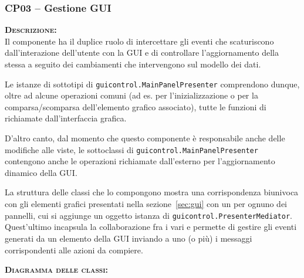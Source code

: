 \subsubsection{CP03 -- Gestione GUI}
\begin{description}
	\item{\scshape\bfseries Descrizione:}\\
Il componente ha il duplice ruolo di intercettare gli eventi che scaturiscono dall'interazione dell'utente con la GUI e di controllare l'aggiornamento della stessa a seguito dei cambiamenti che intervengono sul modello dei dati.

Le istanze di sottotipi di \texttt{guicontrol.MainPanelPresenter} comprendono dunque, oltre ad alcune operazioni comuni (ad es. per l'inizializzazione o per la comparsa/scomparsa dell'elemento grafico associato), tutte le funzioni di  richiamate dall'interfaccia grafica.

D'altro canto, dal momento che questo componente è responsabile anche delle modifiche alle viste, le sottoclassi di \texttt{guicontrol.MainPanelPresenter} contengono anche le operazioni richiamate dall'esterno per l'aggiornamento dinamico della GUI\@.

La struttura delle classi che lo compongono mostra una corrispondenza biunivoca con gli elementi grafici presentati nella sezione~\ref{sec:gui} con un  per ognuno dei pannelli, cui si aggiunge un oggetto istanza di \texttt{guicontrol.PresenterMediator}. Quest'ultimo incapsula la collaborazione fra i vari  e permette di gestire gli eventi generati da un elemento della GUI inviando a uno (o più)  i messaggi corrispondenti alle azioni da compiere.

	\item{\scshape\bfseries Diagramma delle classi:}\\


\end{description}
